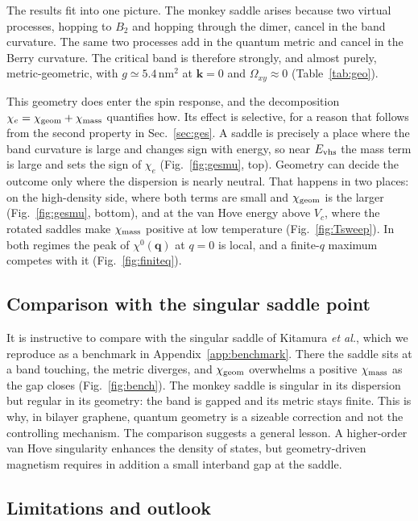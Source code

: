 \documentclass[12pt,a4paper]{article}
\newcommand{\bk}{\mathbf{k}}
\newcommand{\bq}{\mathbf{q}}
\newcommand{\chie}{\chi_{e}}
\newcommand{\chig}{\chi_{\rm geom}}
\newcommand{\chim}{\chi_{\rm mass}}
\newcommand{\Evhs}{E_{\rm vhs}}
\newcommand{\nm}{\,\mathrm{nm}}
\begin{document}
The results fit into one picture. The monkey saddle arises because two virtual processes, hopping to $B_2$ and hopping through the dimer, cancel in the band curvature. The same two processes add in the quantum metric and cancel in the Berry curvature. The critical band is therefore strongly, and almost purely, metric-geometric, with $g\simeq5.4\nm^2$ at $\bk=0$ and $\Omega_{xy}\approx0$ (Table~\ref{tab:geo}).

This geometry does enter the spin response, and the decomposition $\chie=\chig+\chim$ quantifies how. Its effect is selective, for a reason that follows from the second property in Sec.~\ref{sec:ges}. A saddle is precisely a place where the band curvature is large and changes sign with energy, so near $\Evhs$ the mass term is large and sets the sign of $\chie$ (Fig.~\ref{fig:gesmu}, top). Geometry can decide the outcome only where the dispersion is nearly neutral. That happens in two places: on the high-density side, where both terms are small and $\chig$ is the larger (Fig.~\ref{fig:gesmu}, bottom), and at the van Hove energy above $V_c$, where the rotated saddles make $\chim$ positive at low temperature (Fig.~\ref{fig:Tsweep}). In both regimes the peak of $\chi^0(\bq)$ at $q=0$ is local, and a finite-$q$ maximum competes with it (Fig.~\ref{fig:finiteq}).

\subsection{Comparison with the singular saddle point}

It is instructive to compare with the singular saddle of Kitamura \emph{et al.}, which we reproduce as a benchmark in Appendix~\ref{app:benchmark}. There the saddle sits at a band touching, the metric diverges, and $\chig$ overwhelms a positive $\chim$ as the gap closes (Fig.~\ref{fig:bench}). The monkey saddle is singular in its dispersion but regular in its geometry: the band is gapped and its metric stays finite. This is why, in bilayer graphene, quantum geometry is a sizeable correction and not the controlling mechanism. The comparison suggests a general lesson. A higher-order van Hove singularity enhances the density of states, but geometry-driven magnetism requires in addition a small interband gap at the saddle.

\subsection{Limitations and outlook}
\end{document}
